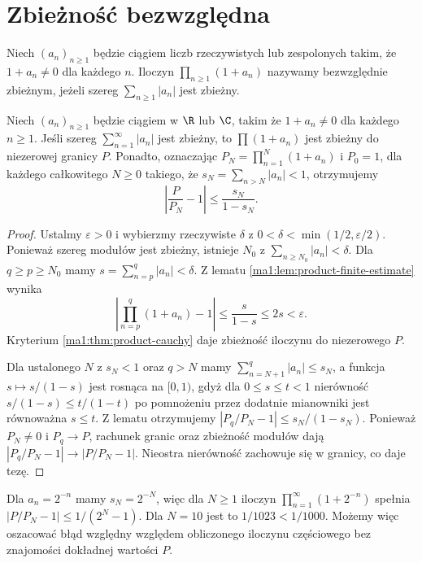 \section{Zbieżność bezwzględna}
\begin{definicja}
\label{ma1:def:absolute-product}
Niech $(a_n)_{n\ge1}$ będzie ciągiem liczb rzeczywistych lub zespolonych takim, że $1+a_n\ne0$ dla każdego $n$. Iloczyn $\prod_{n\ge1}(1+a_n)$ nazywamy bezwzględnie zbieżnym, jeżeli szereg $\sum_{n\ge1}|a_n|$ jest zbieżny.
\end{definicja}
\begin{twierdzenie}
\label{ma1:thm:absolute-product}
Niech $(a_n)_{n\ge1}$ będzie ciągiem w $\R$ lub $\C$, takim że $1+a_n\ne0$ dla każdego $n\ge1$. Jeśli szereg $\sum_{n=1}^\infty|a_n|$ jest zbieżny, to $\prod(1+a_n)$ jest zbieżny do niezerowej granicy $P$. Ponadto, oznaczając $P_N=\prod_{n=1}^N(1+a_n)$ i $P_0=1$, dla każdego całkowitego $N\ge0$ takiego, że $s_N=\sum_{n>N}|a_n|<1$, otrzymujemy
\[
 \left|\frac{P}{P_N}-1\right|\le\frac{s_N}{1-s_N}.
\]
\end{twierdzenie}
\begin{proof}
Ustalmy $\varepsilon>0$ i wybierzmy rzeczywiste $\delta$ z $0<\delta<\min(1/2,\varepsilon/2)$. Ponieważ szereg modułów jest zbieżny, istnieje $N_0$ z $\sum_{n\ge N_0}|a_n|<\delta$. Dla $q\ge p\ge N_0$ mamy $s=\sum_{n=p}^q|a_n|<\delta$. Z lematu \ref{ma1:lem:product-finite-estimate} wynika
\[
 \left|\prod_{n=p}^q(1+a_n)-1\right|
 \le\frac{s}{1-s}\le2s<\varepsilon.
\]
Kryterium \ref{ma1:thm:product-cauchy} daje zbieżność iloczynu do niezerowego $P$.

Dla ustalonego $N$ z $s_N<1$ oraz $q>N$ mamy $\sum_{n=N+1}^q|a_n|\le s_N$, a funkcja $s\mapsto s/(1-s)$ jest rosnąca na $[0,1)$, gdyż dla $0\le s\le t<1$ nierówność $s/(1-s)\le t/(1-t)$ po pomnożeniu przez dodatnie mianowniki jest równoważna $s\le t$. Z lematu otrzymujemy $|P_q/P_N-1|\le s_N/(1-s_N)$. Ponieważ $P_N\ne0$ i $P_q\to P$, rachunek granic oraz zbieżność modułów dają $|P_q/P_N-1|\to|P/P_N-1|$. Nieostra nierówność zachowuje się w granicy, co daje tezę.
\end{proof}
\begin{przyklad}
Dla $a_n=2^{-n}$ mamy $s_N=2^{-N}$, więc dla $N\ge1$ iloczyn $\prod_{n=1}^\infty(1+2^{-n})$ spełnia
$|P/P_N-1|\le1/(2^N-1)$. Dla $N=10$ jest to $1/1023<1/1000$. Możemy więc oszacować błąd względny względem obliczonego iloczynu częściowego bez znajomości dokładnej wartości $P$.
\end{przyklad}

